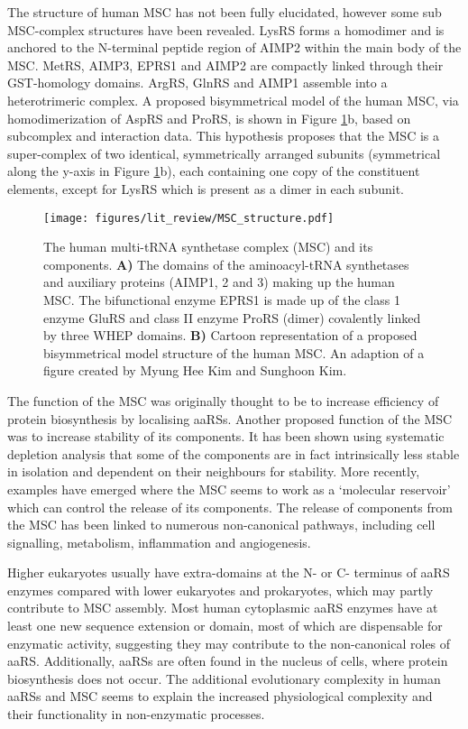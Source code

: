The structure of human MSC has not been fully elucidated, however some sub MSC-complex structures have been revealed.
LysRS forms a homodimer and is anchored to the N-terminal peptide region of AIMP2 within the main body of the MSC.
MetRS, AIMP3, EPRS1 and AIMP2 are compactly linked through their GST-homology domains.
ArgRS, GlnRS and AIMP1 assemble into a heterotrimeric complex\cite{kim2019evolution, khan20203, kim2020structures}.
A proposed bisymmetrical model of the human MSC, via homodimerization of AspRS and ProRS, is shown in Figure \ref{fig:MSC}b, based on subcomplex and interaction data\cite{cho2015assembly, kaminska2009dissection, mirande2017aminoacyl}.
This hypothesis proposes that the MSC is a super-complex of two identical, symmetrically arranged subunits (symmetrical along the y-axis in Figure \ref{fig:MSC}b), each containing one copy of the constituent elements, except for LysRS which is present as a dimer in each subunit.

\begin{figure}[htb]
\centering
\texttt{[image: figures/lit\_review/MSC\_structure.pdf]}
\caption[Human multi-tRNA synthetase complex structure]{The human multi-tRNA synthetase complex (MSC) and its components.
\textbf{A)} The domains of the aminoacyl-tRNA synthetases and auxiliary proteins (AIMP1, 2 and 3) making up the human MSC.
The bifunctional enzyme EPRS1 is made up of the class 1 enzyme GluRS and class II enzyme ProRS (dimer) covalently linked by three WHEP domains.
\textbf{B)} Cartoon representation of a proposed bisymmetrical model structure of the human MSC.
An adaption of a figure created by Myung Hee Kim and Sunghoon Kim\cite{kim2020structures}.
}
\label{fig:MSC}\end{figure}

The function of the MSC was originally thought to be to increase efficiency of protein biosynthesis by localising aaRSs.
Another proposed function of the MSC was to increase stability of its components.
It has been shown using systematic depletion analysis that some of the components are in fact intrinsically less stable in isolation and dependent on their neighbours for stability\cite{han2006hierarchical}.
More recently, examples have emerged where the MSC seems to work as a `molecular reservoir' which can control the release of its components.
The release of components from the MSC has been linked to numerous non-canonical pathways, including cell signalling, metabolism, inflammation and angiogenesis.

Higher eukaryotes usually have extra-domains at the N- or C- terminus of aaRS enzymes compared with lower eukaryotes and prokaryotes, which may partly contribute to MSC assembly.
Most human cytoplasmic aaRS enzymes have at least one new sequence extension or domain, most of which are dispensable for enzymatic activity, suggesting they may contribute to the non-canonical roles of aaRS.
Additionally, aaRSs are often found in the nucleus of cells, where protein biosynthesis does not occur.
The additional evolutionary complexity in human aaRSs and MSC seems to explain the increased physiological complexity and their functionality in non-enzymatic processes.

